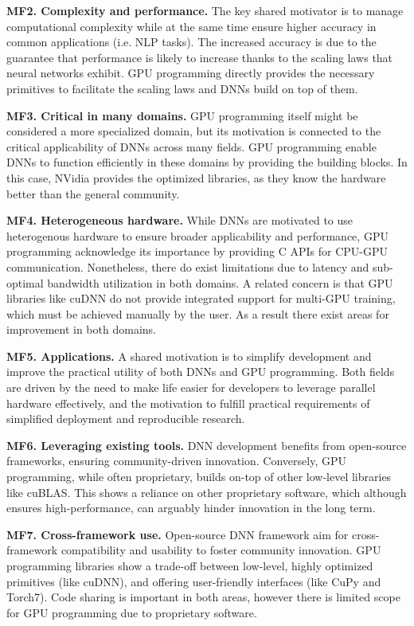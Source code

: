 \textbf{MF2. Complexity and performance.}
The key shared motivator is to manage computational complexity while at the same time ensure higher accuracy
in common applications (i.e. NLP tasks). The increased accuracy is due to the guarantee that performance
is likely to increase thanks to the scaling laws that neural networks exhibit.
GPU programming directly provides the necessary primitives to facilitate the scaling laws and DNNs build on top of them.

\textbf{MF3. Critical in many domains.}
GPU programming itself might be considered a more specialized domain, but its motivation is connected to the
critical applicability of DNNs across many fields. GPU programming enable DNNs to function efficiently in
these domains by providing the building blocks. In this case, NVidia provides the optimized libraries, as
they know the hardware better than the general community.

\textbf{MF4. Heterogeneous hardware.}
While DNNs are motivated to use heterogenous hardware to ensure broader applicability and performance, GPU programming
acknowledge its importance by providing C APIs for CPU-GPU communication. Nonetheless, there do exist limitations
due to latency and sub-optimal bandwidth utilization in both domains. A related concern is that GPU libraries like cuDNN do not provide
integrated support for multi-GPU training, which must be achieved manually by the user. As a result there exist areas
for improvement in both domains.

\textbf{MF5. Applications.}
A shared motivation is to simplify development and improve the practical utility of both DNNs and GPU programming.
Both fields are driven by the need to make life easier for developers to leverage parallel hardware effectively,
and the motivation to fulfill practical requirements of simplified deployment and reproducible research.

\textbf{MF6. Leveraging existing tools.}
DNN development benefits from open-source frameworks, ensuring community-driven innovation. Conversely, GPU programming,
while often proprietary, builds on-top of other low-level libraries like cuBLAS. This shows a reliance on other
proprietary software, which although ensures high-performance, can arguably hinder innovation in the long term.

\textbf{MF7. Cross-framework use.}
Open-source DNN framework aim for cross-framework compatibility and usability to foster community innovation.
GPU programming libraries show a trade-off between low-level, highly optimized primitives (like cuDNN), and offering
user-friendly interfaces (like CuPy and Torch7). Code sharing is important in both areas, however there is limited
scope for GPU programming due to proprietary software.


